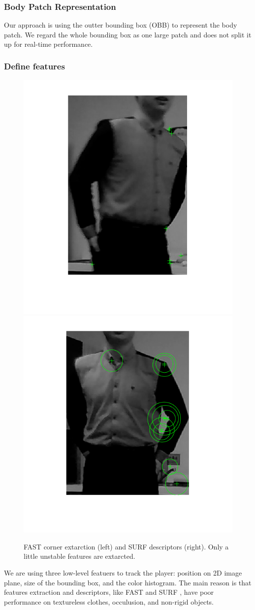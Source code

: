 \documentclass[11pt,twocolumn,letterpaper]{article}
\begin{document}
\subsubsection*{Body Patch Representation}
\par
Our approach is using the outter bounding box (OBB) to represent the body patch. We regard the whole bounding box as one large patch and does not split it up for real-time performance.
\subsubsection*{Define features}
      \begin{figure}[h]
      \centering
      \includegraphics[width=0.45\linewidth]{./Pic/FAST.png}
	\includegraphics[width=0.45\linewidth]{./Pic/SURF.png}
      \caption{FAST corner extarction (left) and SURF descriptors (right). Only a little unstable features are extarcted.}
      \end{figure}
We are using three low-level featuers to track the player: position on 2D image plane, size of the bounding box, and the color histogram. The main reason is that features extraction and descriptors, like FAST \cite{1544896} and SURF \cite{Bay2006}, have poor performance on textureless clothes, occulusion, and non-rigid objects.
\end{document}
